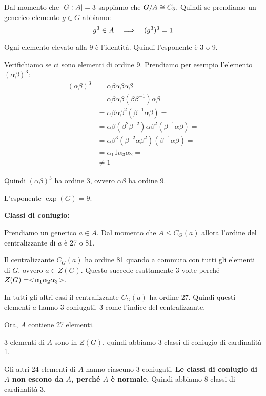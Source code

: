 \begin{soluzione}
    Dal momento che $\lvert G:A \rvert = 3$ sappiamo che $G/A \cong C_3$.
    Quindi se prendiamo un generico elemento $g \in G$ abbiamo:
    \begin{equation*}
        g^3 \in A \quad\Longrightarrow\quad (g^3)^3 = 1
    \end{equation*}

    Ogni elemento elevato alla 9 è l'identità.
    Quindi l'esponente è 3 o 9.

    Verifichiamo se ci sono elementi di ordine 9.
    Prendiamo per esempio l'elemento $(\alpha\beta)^3$:
    \begin{align*}
    (\alpha\beta)^3 &= \alpha\beta \alpha\beta \alpha\beta = \\
        &= \alpha\beta \alpha\beta (\beta \beta^{-1}) \alpha\beta = \\
        &= \alpha\beta \alpha\beta^2(\beta^{-1} \alpha\beta) = \\
        &= \alpha\beta (\beta^2\beta^{-2}) \alpha \beta^2(\beta^{-1} \alpha\beta) = \\
        &= \alpha\beta^3(\beta^{-2} \alpha \beta^2)(\beta^{-1} \alpha\beta) = \\
        &= \alpha_1 1 \alpha_3 \alpha_2 = \\
        &\ne 1
    \end{align*}

    Quindi $(\alpha\beta)^3$ ha ordine 3, ovvero $\alpha\beta$ ha ordine 9.

    L'esponente $\exp(G) = 9$.

    \bigskip
    \textbf{Classi di coniugio:}

    Prendiamo un generico $a \in A$.
    Dal momento che $A \le C_G(a)$ allora l'ordine del centralizzante di $a$ è 27 o 81.

    Il centralizzante $C_G(a)$ ha ordine 81 quando a commuta con tutti gli elementi di $G$, ovvero $a \in Z(G)$.
    Questo succede esattamente 3 volte perché $Z(G) = < \negmedspace \alpha_1\alpha_2\alpha_3 \negmedspace >$.

    In tutti gli altri casi il centralizzante $C_G(a)$ ha ordine 27.
    Quindi questi elementi $a$ hanno 3 coniugati, 3 come l'indice del centralizzante.

    Ora, $A$ contiene 27 elementi.

    3 elementi di $A$ sono in $Z(G)$, quindi abbiamo 3 classi di coniugio di cardinalità 1.

    Gli altri 24 elementi di $A$ hanno ciascuno 3 coniugati.
    \textbf{Le classi di coniugio di $A$ non escono da $A$, perché $A$ è normale.}
    Quindi abbiamo 8 classi di cardinalità 3.
\end{soluzione}